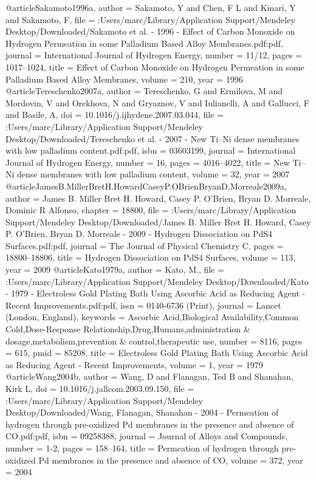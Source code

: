 @article{Sakamoto1996a,
author = {Sakamoto, Y and Chen, F L and Kinari, Y and Sakamoto, F},
file = {:Users/marc/Library/Application Support/Mendeley Desktop/Downloaded/Sakamoto et al. - 1996 - Effect of Carbon Monoxide on Hydrogen Permeation in some Palladium Based Alloy Membranes.pdf:pdf},
journal = {International Journal of Hydrogen Energy},
number = {11/12},
pages = {1017--1024},
title = {{Effect of Carbon Monoxide on Hydrogen Permeation in some Palladium Based Alloy Membranes}},
volume = {210},
year = {1996}
}
@article{Tereschenko2007a,
author = {Tereschenko, G and Ermilova, M and Mordovin, V and Orekhova, N and Gryaznov, V and Iulianelli, A and Gallucci, F and Basile, A},
doi = {10.1016/j.ijhydene.2007.03.044},
file = {:Users/marc/Library/Application Support/Mendeley Desktop/Downloaded/Tereschenko et al. - 2007 - New Ti–Ni dense membranes with low palladium content.pdf:pdf},
isbn = {03603199},
journal = {International Journal of Hydrogen Energy},
number = {16},
pages = {4016--4022},
title = {{New Ti–Ni dense membranes with low palladium content}},
volume = {32},
year = {2007}
}
@article{JamesB.MillerBretH.HowardCaseyP.OBrienBryanD.Morreale2009a,
author = {{James B. Miller  Bret H. Howard, Casey P. O'Brien, Bryan D. Morreale}, Dominic R Alfonso},
chapter = {18800},
file = {:Users/marc/Library/Application Support/Mendeley Desktop/Downloaded/James B. Miller Bret H. Howard, Casey P. O'Brien, Bryan D. Morreale - 2009 - Hydrogen Dissociation on PdS4 Surfaces.pdf:pdf},
journal = {The Journal of Physical Chemistry C},
pages = {18800--18806},
title = {{Hydrogen Dissociation on PdS4 Surfaces}},
volume = {113},
year = {2009}
}
@article{Kato1979a,
author = {Kato, M.},
file = {:Users/marc/Library/Application Support/Mendeley Desktop/Downloaded/Kato - 1979 - Electroless Gold Plating Bath Using Ascorbic Acid as Reducing Agent - Recent Improvements.pdf:pdf},
issn = {0140-6736 (Print)},
journal = {Lancet (London, England)},
keywords = {Ascorbic Acid,Biological Availability,Common Cold,Dose-Response Relationship,Drug,Humans,administration {\&} dosage,metabolism,prevention {\&} control,therapeutic use},
number = {8116},
pages = {615},
pmid = {85208},
title = {{Electroless Gold Plating Bath Using Ascorbic Acid as Reducing Agent - Recent Improvements}},
volume = {1},
year = {1979}
}
@article{Wang2004b,
author = {Wang, D and Flanagan, Ted B and Shanahan, Kirk L},
doi = {10.1016/j.jallcom.2003.09.150},
file = {:Users/marc/Library/Application Support/Mendeley Desktop/Downloaded/Wang, Flanagan, Shanahan - 2004 - Permeation of hydrogen through pre-oxidized Pd membranes in the presence and absence of CO.pdf:pdf},
isbn = {09258388},
journal = {Journal of Alloys and Compounds},
number = {1-2},
pages = {158--164},
title = {{Permeation of hydrogen through pre-oxidized Pd membranes in the presence and absence of CO}},
volume = {372},
year = {2004}
}
